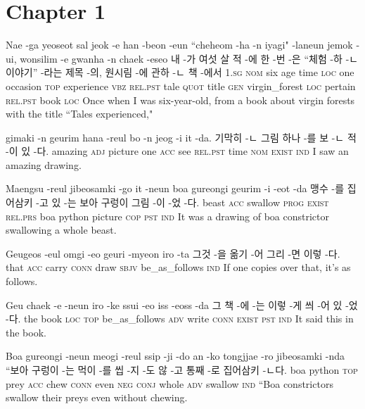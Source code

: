\section*{Chapter 1}

\begin{example}
\tgl
		{Nae -ga yeoseot sal jeok -e han -beon -eun ``cheheom -ha -n iyagi" -laneun jemok -ui, wonsilim -e gwanha -n chaek -eseo}
		{내 -가 여섯 살 적 -에 한 -번 -은 ``체험 -하 -ㄴ 이야기” -라는 제목 -의, 원시림 -에 관하 -ㄴ 책 -에서}
		{\textsc{1.sg} \textsc{nom} six age time \textsc{loc} one occasion \textsc{top}	experience \textsc{vbz} \textsc{rel.pst} tale \textsc{quot} title \textsc{gen} virgin\_forest \textsc{loc} pertain \textsc{rel.pst} book \textsc{loc}}
		{Once when I was six-year-old, from a book about virgin forests with the title ``Tales experienced,"}
		
\tgl
		{gimaki -n geurim hana -reul bo -n jeog -i it -da.}
		{기막히 -ㄴ 그림 하나 -를 보 -ㄴ 적 -이 있 -다.}
		{amazing \textsc{adj} picture one \textsc{acc} see \textsc{rel.pst} time \textsc{nom} \textsc{exist} \textsc{ind}}
		{I saw an amazing drawing.}
\end{example}

\begin{example}
\tgl
		{Maengsu -reul jibeosamki -go it -neun boa gureongi geurim -i -eot -da}
		{맹수 -를 집어삼키 -고 있 -는 보아 구렁이 그림 -이 -었 -다.}
		{beast \textsc{acc} swallow \textsc{prog} \textsc{exist} \textsc{rel.prs} boa python picture \textsc{cop} \textsc{pst} \textsc{ind}}
		{It was a drawing of boa constrictor swallowing a whole beast.}
\end{example}

\begin{example}
\tgl
		{Geugeos -eul omgi -eo geuri -myeon iro -ta}
		{그것 -을 옮기 -어 그리 -면 이렇 -다.}
		{that \textsc{acc} carry \textsc{conn} draw \textsc{sbjv} be\_as\_follows \textsc{ind}}
		{If one copies over that, it's as follows.}
\end{example}

\begin{example}
\tgl
		{Geu chaek -e -neun iro -ke ssui -eo iss -eoss -da}
		{그 책 -에 -는 이렇 -게 씌 -어 있 -었 -다.}
		{the book \textsc{loc} \textsc{top} be\_as\_follows \textsc{adv} write \textsc{conn} \textsc{exist} \textsc{pst} \textsc{ind}}
		{It said this in the book.}
\end{example}

\begin{example}
\tgl
		{Boa gureongi -neun meogi -reul ssip -ji -do an -ko tongjjae -ro jibeosamki -nda}
		{``보아 구렁이 -는 먹이 -를 씹 -지 -도 않 -고 통째 -로 집어삼키 -ㄴ다.}
		{boa python \textsc{top} prey \textsc{acc} chew \textsc{conn} even \textsc{neg} \textsc{conj} whole \textsc{adv} swallow \textsc{ind}}
		{``Boa constrictors swallow their preys even without chewing.}
\end{example}

